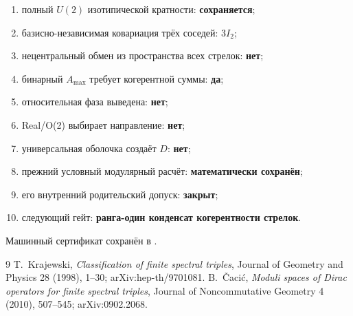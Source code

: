 \begin{protocol}
\begin{enumerate}
 \item полный $U(2)$ изотипической кратности: \textbf{сохраняется};
 \item базисно-независимая ковариация трёх соседей: \textbf{$3I_2$};
 \item нецентральный обмен из пространства всех стрелок: \textbf{нет};
 \item бинарный $A_{\max}$ требует когерентной суммы: \textbf{да};
 \item относительная фаза выведена: \textbf{нет};
 \item Real/O(2) выбирает направление: \textbf{нет};
 \item универсальная оболочка создаёт $D$: \textbf{нет};
 \item прежний условный модулярный расчёт: \textbf{математически сохранён};
 \item его внутренний родительский допуск: \textbf{закрыт};
 \item следующий гейт: \textbf{ранга-один конденсат когерентности стрелок}.
\end{enumerate}
\end{protocol}

Машинный сертификат сохранён в
.

\begin{thebibliography}{9}
T.~Krajewski,
\emph{Classification of finite spectral triples},
Journal of Geometry and Physics 28 (1998), 1--30;
arXiv:hep-th/9701081.
B.~\v Caci\'c,
\emph{Moduli spaces of Dirac operators for finite spectral triples},
Journal of Noncommutative Geometry 4 (2010), 507--545;
arXiv:0902.2068.
\end{thebibliography}
